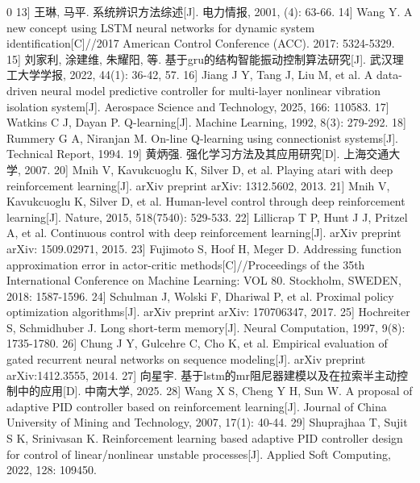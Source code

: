 \documentclass{scrbook}
\begin{document}
{\begin{thebibliography}{0}
\bibitem[bib-13]{}{[}13{]}	王琳, 马平. 系统辨识方法综述{[}J{]}. 电力情报, 2001, (4): 63-66.
\bibitem[bib-14]{}{[}14{]}	Wang Y. A new concept using LSTM neural networks for dynamic system identification{[}C{]}//2017 American Control Conference (ACC). 2017: 5324-5329.
\bibitem[bib-15]{}{[}15{]}	刘家利, 涂建维, 朱耀阳, 等. 基于gru的结构智能振动控制算法研究{[}J{]}. 武汉理工大学学报, 2022, 44(1): 36-42, 57.
\bibitem[bib-16]{}{[}16{]}	Jiang J Y, Tang J, Liu M, et al. A data-driven neural model predictive controller for multi-layer nonlinear vibration isolation system{[}J{]}. Aerospace Science and Technology, 2025, 166: 110583.
\bibitem[bib-17]{}{[}17{]}	Watkins C J, Dayan P. Q-learning{[}J{]}. Machine Learning, 1992, 8(3): 279-292.
\bibitem[bib-18]{}{[}18{]}	Rummery G A, Niranjan M. On-line Q-learning using connectionist systems{[}J{]}. Technical Report, 1994.
\bibitem[bib-19]{}{[}19{]}	黄炳强. 强化学习方法及其应用研究{[}D{]}. 上海交通大学, 2007.
\bibitem[bib-20]{}{[}20{]}	Mnih V, Kavukcuoglu K, Silver D, et al. Playing atari with deep reinforcement learning{[}J{]}. arXiv preprint arXiv: 1312.5602, 2013.
\bibitem[bib-21]{}{[}21{]}	Mnih V, Kavukcuoglu K, Silver D, et al. Human-level control through deep reinforcement learning{[}J{]}. Nature, 2015, 518(7540): 529-533.
\bibitem[bib-22]{}{[}22{]}	Lillicrap T P, Hunt J J, Pritzel A, et al. Continuous control with deep reinforcement learning{[}J{]}. arXiv preprint arXiv: 1509.02971, 2015.
\bibitem[bib-23]{}{[}23{]}	Fujimoto S, Hoof H, Meger D. Addressing function approximation error in actor-critic methods{[}C{]}//Proceedings of the 35th International Conference on Machine Learning: VOL 80. Stockholm, SWEDEN, 2018: 1587-1596.
\bibitem[bib-24]{}{[}24{]}	Schulman J, Wolski F, Dhariwal P, et al. Proximal policy optimization algorithms{[}J{]}. arXiv preprint arXiv: 170706347, 2017.
\bibitem[bib-25]{}{[}25{]}	Hochreiter S, Schmidhuber J. Long short-term memory{[}J{]}. Neural Computation, 1997, 9(8): 1735-1780.
\bibitem[bib-26]{}{[}26{]}	Chung J Y, Gulcehre C, Cho K, et al. Empirical evaluation of gated recurrent neural networks on sequence modeling{[}J{]}. arXiv preprint arXiv:1412.3555, 2014.
\bibitem[bib-27]{}{[}27{]}	向星宇. 基于lstm的mr阻尼器建模以及在拉索半主动控制中的应用{[}D{]}. 中南大学, 2025.
\bibitem[bib-28]{}{[}28{]}	Wang X S, Cheng Y H, Sun W. A proposal of adaptive PID controller based on reinforcement learning{[}J{]}. Journal of China University of Mining and Technology, 2007, 17(1): 40-44.
\bibitem[bib-29]{}{[}29{]}	Shuprajhaa T, Sujit S K, Srinivasan K. Reinforcement learning based adaptive PID controller design for control of linear/nonlinear unstable processes{[}J{]}. Applied Soft Computing, 2022, 128: 109450.

\end{thebibliography}}
\end{document}
